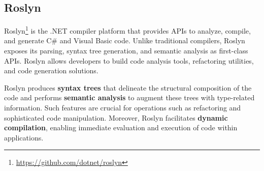 \subsection{Roslyn}

Roslyn\footnote{\href{https://github.com/dotnet/roslyn}{https://github.com/dotnet/roslyn}} is the .NET compiler platform that provides APIs to analyze, compile, and generate C\# and Visual Basic code. Unlike traditional compilers, Roslyn exposes its parsing, syntax tree generation, and semantic analysis as first-class APIs. Roslyn allows developers to build code analysis tools, refactoring utilities, and code generation solutions.

Roslyn produces \textbf{syntax trees} that delineate the structural composition of the code and performs \textbf{semantic analysis} to augment these trees with type-related information. Such features are crucial for operations such as refactoring and sophisticated code manipulation. Moreover, Roslyn facilitates \textbf{dynamic compilation}, enabling immediate evaluation and execution of code within applications.




